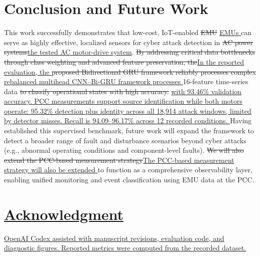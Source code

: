 \documentclass[conference,onecolumn,letterpaper]{IEEEtran} %
\providecommand{\DIFadd}[1]{{\protect\color{blue} \sf #1}} %
\providecommand{\DIFdel}[1]{{\protect\color{red} \scriptsize #1}} %
\providecommand{\DIFaddbegin}{} %
\providecommand{\DIFaddend}{} %
\providecommand{\DIFdelbegin}{} %
\providecommand{\DIFdelend}{} %
\renewcommand{\DIFadd}[1]{{\protect\color{blue}\protect\uline{#1}}}
\renewcommand{\DIFdel}[1]{{\protect\color{red}\protect\sout{#1}}}
\begin{document}
\section{Conclusion and Future Work}

This work successfully demonstrates that low-cost, IoT-enabled \DIFdelbegin \DIFdel{EMU }\DIFdelend \DIFaddbegin \DIFadd{EMUs }\DIFaddend can serve as highly effective, localized sensors for cyber attack detection in \DIFdelbegin \DIFdel{AC power systems}\DIFdelend \DIFaddbegin \DIFadd{the tested AC motor-drive system}\DIFaddend . \DIFdelbegin \DIFdel{By addressing critical data bottlenecks through class weighting and advanced feature preservation, the}\DIFdelend \DIFaddbegin \DIFadd{In the reported evaluation, the }\DIFaddend \DIFdelbegin \DIFdel{proposed Bidirectional GRU framework reliably processes complex }\DIFdelend \DIFaddbegin \DIFadd{rebalanced multihead CNN--Bi-GRU framework processes }\DIFaddend 16-feature time-series data \DIFdelbegin \DIFdel{to classify operational states with high accuracy. }\DIFdelend \DIFaddbegin \DIFadd{with 93.46\% validation accuracy. PCC measurements support source identification while both motors operate: 95.32\% detection plus identity across all 18,914 attack windows, limited by detector misses. Recall is 94.09--96.17\% across 12 recorded conditions. }\DIFaddend Having established this supervised benchmark, future work will expand the framework to detect a broader range of fault and disturbance scenarios beyond cyber attacks (e.g., abnormal operating conditions and component-level faults). \DIFdelbegin \DIFdel{We will also extend the PCC-based measurement strategy}\DIFdelend \DIFaddbegin \DIFadd{The PCC-based measurement strategy will also be extended }\DIFaddend  to function as a comprehensive observability layer, enabling unified monitoring and event classification using EMU data at the PCC.

\DIFaddbegin \section*{\DIFadd{Acknowledgment}}
\DIFadd{OpenAI Codex assisted with manuscript revisions, evaluation code, and diagnostic figures. Reported metrics were computed from the recorded dataset.
}

\DIFaddend 
\DIFdelbegin %
\DIFdelend \DIFaddbegin 
\DIFaddend 
\end{document}
